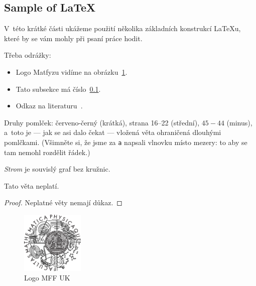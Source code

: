 
\subsection{Sample of \LaTeX}
\label{ssec:ukazka}

V~této krátké části ukážeme použití několika základních konstrukcí \LaTeX{}u,
které by se vám mohly při psaní práce hodit.

Třeba odrážky:

\begin{itemize}
\item Logo Matfyzu vidíme na obrázku~\ref{fig:mff}.
\item Tato subsekce má číslo~\ref{ssec:ukazka}.
\item Odkaz na literaturu~\cite{lamport94}.
\end{itemize}

Druhy pomlček:
červeno-černý (krátká),
strana 16--22 (střední),
$45-44$ (minus),
a~toto je --- jak se asi dalo čekat --- vložená věta ohraničená dlouhými pomlčkami.
(Všimněte si, že jsme za \verb|a| napsali vlnovku místo mezery: to aby se
tam nemohl rozdělit řádek.)


\begin{define}
{\sl Strom} je souvislý graf bez kružnic.
\end{define}

\begin{theorem}
Tato věta neplatí.
\end{theorem}

\begin{proof}
Neplatné věty nemají důkaz.
\end{proof}

\begin{figure}
	\centering
	\includegraphics[width=30mm]{logo.eps}
	\caption{Logo MFF UK}
	\label{fig:mff}
\end{figure}

